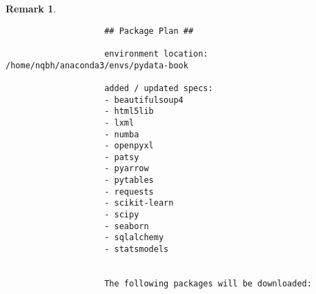 \documentclass{article}
\newtheorem{remark}{Remark}
\begin{document}
\begin{itemize}
\begin{itemize}
\begin{itemize}
\begin{remark}
\begin{verbatim}
					## Package Plan ##                                                              
					
					environment location: /home/nqbh/anaconda3/envs/pydata-book                   
					
					added / updated specs:                                                        
					- beautifulsoup4                                                            
					- html5lib                                                                  
					- lxml                                                                      
					- numba           
					- openpyxl
					- patsy
					- pyarrow
					- pytables
					- requests
					- scikit-learn
					- scipy
					- seaborn
					- sqlalchemy
					- statsmodels
					
					
					The following packages will be downloaded:
					

\end{verbatim}
\end{remark}
\end{itemize}
\end{itemize}
\end{itemize}
\end{document}
